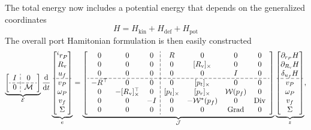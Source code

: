 The total energy now includes a potential energy that depends on the generalized coordinates
\begin{equation*}
H = H_{\text{kin}} + H_{\text{def}} + H_{\text{pot}}
\end{equation*}
The overall port Hamitonian formulation is then easily constructed 
\begin{equation}
\label{eq:ph_mfd_all}
\setlength{\dashlinegap}{2pt}
\underbrace{
	{\left[ \begin{array}{c:c}
		I & 0 \\
		\hdashline
		0 & \mathcal{M} \\
		\end{array} \right]}
}_{\mathcal{E}}
\diff{}{t}
\underbrace{\begin{bmatrix}
^i r_P \\ R_{\text{v}} \\ u_f \\\hdashline  v_P \\ \omega_P  \\ v_f  \\ \Sigma \\
\end{bmatrix}}_{e} = 
\underbrace{
	{\left[ \begin{array}{ccc:cccc}
		0 & 0 & 0 &  R & 0 & 0 & 0 \\
		0 & 0 & 0 & 0 & \crmat{R_{\text{v}}} & 0 & 0 \\
		0 & 0 & 0 & 0 & 0 & I & 0 \\ 
		\hdashline 
		-R^\top & 0 & 0 & 0 & \crmat{p_t} & 0 & 0 \\
		0 & -\crmat{R_{\text{v}}}^\top & 0 & \crmat{p_t} & \crmat{p_r} & \mathcal{W}(p_f) & 0 \\
		0 & 0 & -I & 0 & -\mathcal{W}^*(p_f) & 0 & \Div \\
		0 & 0 & 0 & 0 & 0 & \Grad & 0 \\
		\end{array} \right]}
	}_{\mathcal{J}}
\underbrace{\begin{bmatrix}
\partial_{r_P}H \\ \partial_{R_\text{v}}H \\ \delta_{u_f} H \\\hdashline  v_P \\ \omega_P  \\ v_f  \\ \Sigma \\
\end{bmatrix}}_{z},
\end{equation} 
